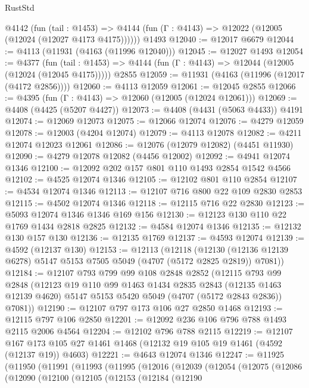 \begin{lexlean}{RustStd}
\begin{coremodule}
    @4142
      (fun (tail : @1453) =>
      @4144 (fun (Γ : @4143) => @12022 (@12005 (@12024 (@12027 @4173 @4175))))))
    @1493
@12040 := @12017 @6679
@12044 := @4113 (@11931 (@4163 (@11996 @12040)))
@12045 := @12027 @1493
@12054 := @4377
    (fun (tail : @1453) => @4144 (fun (Γ : @4143) => @12044 (@12005 (@12024 (@12045 @4175)))))
    @2855
@12059 := @11931 (@4163 (@11996 (@12017 (@4172 @2856))))
@12060 := @4113 @12059
@12061 := @12045 @2855
@12066 := @4395 (fun (Γ : @4143) => @12060 (@12005 (@12024 @12061)))
@12069 := @4408 (@4425 (@5207 @4427))
@12073 := @4408 (@4431 (@5063 @4433)) @4191
@12074 := @12069 @12073
@12075 := @12066 @12074
@12076 := @4279 @12059
@12078 := @12003 (@4204 @12074)
@12079 := @4113 @12078
@12082 := @4211 @12074 @12023 @12061
@12086 := @12076 (@12079 @12082) (@4451 @11930)
@12090 := @4279 @12078 @12082 (@4456 @12002)
@12092 := @4941 @12074 @1346
@12100 := @12092 @202 @157 @801 @110 @1493 @2854 @1542 @4566
@12102 := @4525 @12074 @1346
@12105 := @12102 @801 @110 @2854
@12107 := @4534 @12074 @1346
@12113 := @12107 @716 @800 @22 @109 @2830 @2853
@12115 := @4502 @12074 @1346
@12118 := @12115 @716 @22 @2830
@12123 := @5093 @12074 @1346 @1346 @169 @156
@12130 := @12123 @130 @110 @22 @1769 @1434 @2818 @2825
@12132 := @4584 @12074 @1346
@12135 := @12132 @130 @157 @130
@12136 := @12135 @1769
@12137 := @4593 @12074
@12139 := @4592 (@12137 @130)
@12153 := @12113
    (@12118
      (@12130 (@12136 @12139 @6278) @5147 @5153 @7505 @5049 (@4707 (@5172 @2825 @2819)) @7081))
@12184 := @12107
    @793
    @799
    @99
    @108
    @2848
    @2852
    (@12115
      @793
      @99
      @2848
      (@12123
        @19
        @110
        @99
        @1463
        @1434
        @2835
        @2843
        (@12135 @1463 @12139 @4620)
        @5147
        @5153
        @5420
        @5049
        (@4707 (@5172 @2843 @2836))
        @7081))
@12190 := @12107 @797 @173 @106 @27 @2850 @1468
@12193 := @12115 @797 @106 @2850
@12201 := @12092 @236 @106 @796 @788 @1493 @2115 @2006 @4564
@12204 := @12102 @796 @788 @2115
@12219 := @12107
    @167
    @173
    @105
    @27
    @1461
    @1468
    (@12132 @19 @105 @19 @1461 (@4592 (@12137 @19)) @4603)
@12221 := @4643 @12074 @1346
@12247 := @11925
    (@11950
      (@11991
        (@11993
          (@11995
            (@12016
              (@12039
                (@12054
                  (@12075
                    (@12086
                      (@12090
                        (@12100
                          (@12105
                            (@12153
                              (@12184
                                (@12190

\end{coremodule}
\end{lexlean}
